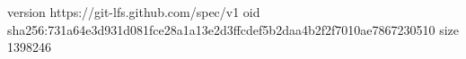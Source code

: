 version https://git-lfs.github.com/spec/v1
oid sha256:731a64e3d931d081fce28a1a13e2d3ffcdef5b2daa4b2f2f7010ae7867230510
size 1398246
